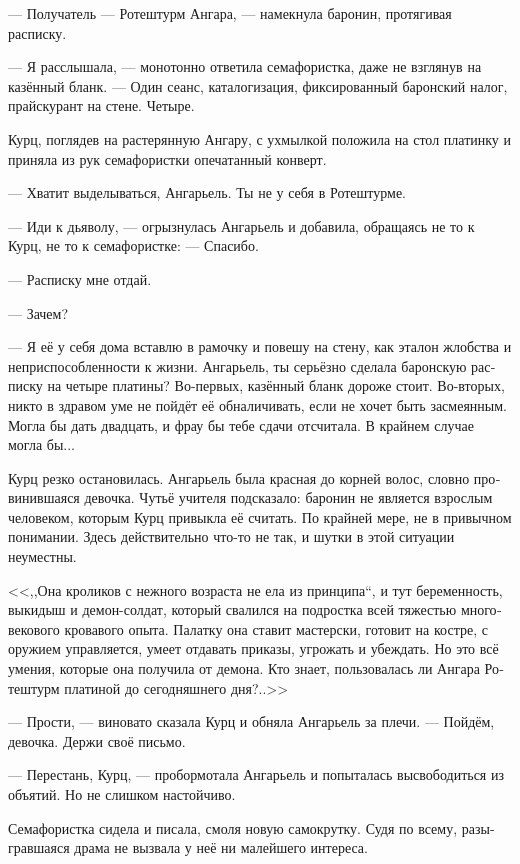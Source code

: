 \documentclass[a4paper,12pt,fleqn]{book}\usepackage{cooltooltips}\usepackage{polyglossia}\setdefaultlanguage[babelshorthands=true]{russian}\setotherlanguage{english}\defaultfontfeatures{Ligatures=TeX,Mapping=tex-text} \usepackage{xcolor}\definecolor{lightgray}{HTML}{bbbbbb}\color{lightgray}\newcommand{\ml}[3]{\textenglish{\textcolor{black}{#3}}}
\begin{document}
--- Получатель --- Ротештурм Ангара, --- намекнула баронин, протягивая расписку.

--- Я расслышала, --- монотонно ответила семафористка, даже не взглянув на казённый бланк.
--- Один сеанс, каталогизация, фиксированный баронский налог, прайскурант на стене.
Четыре.

Курц, поглядев на растерянную Ангару, с ухмылкой положила на стол платинку и приняла из рук семафористки опечатанный конверт.

--- Хватит выделываться, Ангарьель.
Ты не у себя в Ротештурме.

--- Иди к дьяволу, --- огрызнулась Ангарьель и добавила, обращаясь не то к Курц, не то к семафористке:
--- Спасибо.

--- Расписку мне отдай.

--- Зачем?

--- Я её у себя дома вставлю в рамочку и повешу на стену, как эталон жлобства и неприспособленности к жизни.
Ангарьель, ты серьёзно сделала баронскую расписку на четыре платины?
Во-первых, казённый бланк дороже стоит.
Во-вторых, никто в здравом уме не пойдёт её обналичивать, если не хочет быть засмеянным.
Могла бы дать двадцать, и фрау бы тебе сдачи отсчитала.
В крайнем случае могла бы...

Курц резко остановилась.
Ангарьель была красная до корней волос, словно провинившаяся девочка.
Чутьё учителя подсказало: баронин не является взрослым человеком, которым Курц привыкла её считать.
По крайней мере, не в привычном понимании.
Здесь действительно что-то не так, и шутки в этой ситуации неуместны.

<<,,Она кроликов с нежного возраста не ела из принципа``, и тут беременность, выкидыш и демон-солдат, который свалился на подростка всей тяжестью многовекового кровавого опыта.
Палатку она ставит мастерски, готовит на костре, с оружием управляется, умеет отдавать приказы, угрожать и убеждать.
Но это всё умения, которые она получила от демона.
Кто знает, пользовалась ли Ангара Ротештурм платиной до сегодняшнего дня?..>>

--- Прости, --- виновато сказала Курц и обняла Ангарьель за плечи.
--- Пойдём, девочка.
Держи своё письмо.

--- Перестань, Курц, --- пробормотала Ангарьель и попыталась высвободиться из объятий.
Но не слишком настойчиво.

Семафористка сидела и писала, смоля новую самокрутку.
Судя по всему, разыгравшаяся драма не вызвала у неё ни малейшего интереса.
\end{document}
